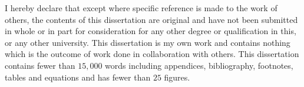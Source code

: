 
\begin{declaration}

I hereby declare that except where specific reference is made to the work of 
others, the contents of this dissertation are original and have not been 
submitted in whole or in part for consideration for any other degree or 
qualification in this, or any other university. This dissertation is my own 
work and contains nothing which is the outcome of work done in collaboration 
with others. This dissertation contains fewer than $15,000$ words including appendices, 
bibliography, footnotes, tables and equations and has fewer than $25$ figures.

\vspace{5em}



\end{declaration}

